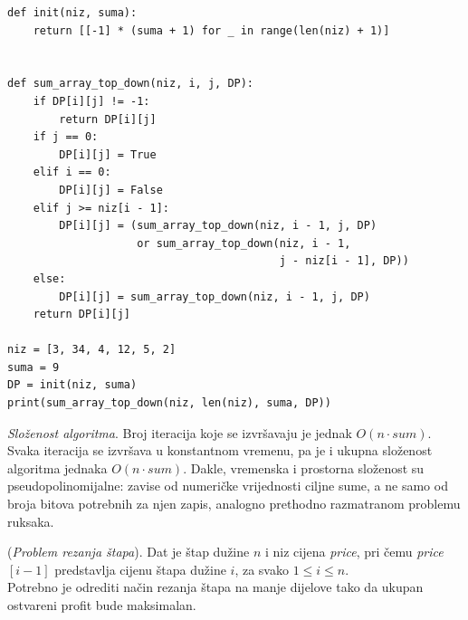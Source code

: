    \begin{verbatim}
def init(niz, suma):
    return [[-1] * (suma + 1) for _ in range(len(niz) + 1)]


def sum_array_top_down(niz, i, j, DP):
    if DP[i][j] != -1:
        return DP[i][j]
    if j == 0:
        DP[i][j] = True
    elif i == 0:
        DP[i][j] = False
    elif j >= niz[i - 1]:
        DP[i][j] = (sum_array_top_down(niz, i - 1, j, DP)
                    or sum_array_top_down(niz, i - 1,
                                          j - niz[i - 1], DP))
    else:
        DP[i][j] = sum_array_top_down(niz, i - 1, j, DP)
    return DP[i][j]

niz = [3, 34, 4, 12, 5, 2]
suma = 9
DP = init(niz, suma)
print(sum_array_top_down(niz, len(niz), suma, DP))
\end{verbatim}  

\textit{Složenost algoritma}. Broj iteracija koje se izvršavaju je jednak $O(n \cdot sum)$. Svaka iteracija se izvršava u konstantnom vremenu, pa je i ukupna složenost algoritma jednaka  $O(n \cdot sum)$. Dakle, vremenska i prostorna složenost su pseudopolinomijalne: zavise od numeričke vrijednosti ciljne sume, a ne samo od broja bitova potrebnih za njen zapis, analogno prethodno razmatranom problemu ruksaka. 

\begin{example}
	(\textit{Problem rezanja štapa}). Dat je štap dužine $n$ i niz cijena \textit{price}, pri čemu \textit{price}$[i-1]$ predstavlja cijenu štapa dužine $i$, za svako $1 \leq i \leq n$.\\ 
	
	Potrebno je odrediti način rezanja štapa na manje dijelove tako da ukupan ostvareni profit bude maksimalan.
	
\end{example}

